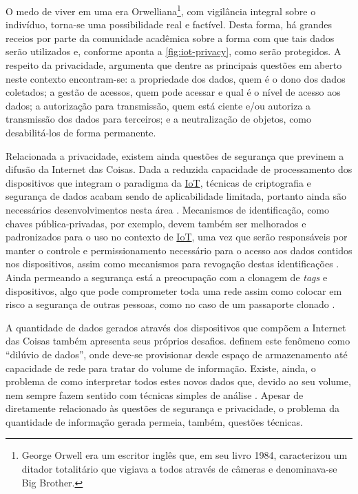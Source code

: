 \documentclass[twoside,english,brazilian]{UNISINOSmonografia}
\begin{document}
O medo de viver em uma era Orwelliana\footnote{
	George Orwell era um escritor inglês que, em seu livro 1984, caracterizou 
	um ditador totalitário que vigiava a todos através de câmeras e 
	denominava-se Big Brother.
}, com vigilância integral sobre o indivíduo, torna-se uma possibilidade real 
e factível.
Desta forma, há grandes receios por parte da comunidade acadêmica sobre a 
forma com que tais dados serão utilizados e, conforme aponta a 
\autoref{fig:iot-privacy}, como serão protegidos. 
A respeito da privacidade,  argumenta que dentre as 
principais questões em aberto neste contexto encontram-se: a propriedade dos 
dados, quem é o dono dos dados coletados; a gestão de acessos, quem pode 
acessar e qual é o nível de acesso aos dados; a autorização para transmissão, 
quem está ciente e/ou autoriza a transmissão dos dados para terceiros; e a 
neutralização de objetos, como desabilitá-los de forma permanente.


Relacionada a privacidade, existem ainda questões de segurança que previnem a 
difusão da Internet das Coisas.
Dada a reduzida capacidade de processamento dos dispositivos que integram o 
paradigma da \hyperref[siglas]{IoT}, técnicas de criptografia e segurança de dados acabam sendo 
de aplicabilidade limitada, portanto ainda são necessários desenvolvimentos 
nesta área \cite{Sundmaeker2010}.
Mecanismos de identificação, como chaves pública-privadas, por exemplo, devem 
também ser melhorados e padronizados para o uso no contexto de \hyperref[siglas]{IoT}, uma vez 
que serão responsáveis por manter o controle e permissionamento necessário 
para o acesso aos dados contidos nos dispositivos, assim como mecanismos para 
revogação destas identificações \cite{Buckley2006}.
Ainda permeando a segurança está a preocupação com a clonagem de \textit{tags} 
e dispositivos, algo que pode comprometer toda uma rede assim como colocar em 
risco a segurança de outras pessoas, como no caso de um passaporte clonado 
\cite{ITU2005}. 


A quantidade de dados gerados através dos dispositivos que compõem a Internet 
das Coisas também apresenta seus próprios desafios. 
 definem este fenômeno como ``dilúvio de dados'', onde 
deve-se provisionar desde espaço de armazenamento até capacidade de rede para 
tratar do volume de informação. Existe, ainda, o problema de como interpretar 
todos estes novos dados que, devido ao seu volume, nem sempre fazem sentido 
com técnicas simples de análise \cite{ITU2005}.
Apesar de diretamente relacionado às questões de segurança e privacidade, o 
problema da quantidade de informação gerada permeia, também, questões técnicas.
\end{document}
